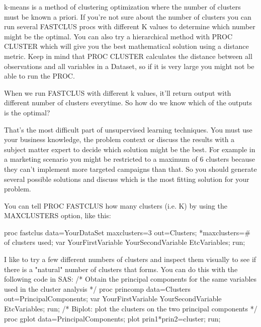 \documentclass[a4paper,12pt]{article}
\begin{document}
\newpage

k-means is a method of clustering optimization where the number of clusters must be known a priori. If you're not sure about the number of clusters you can run several FASTCLUS procs with different K values to determine which number might be the optimal. You can also try a hierarchical method with PROC CLUSTER which will give you the best mathematical solution using a distance metric. Keep in mind that PROC CLUSTER calculates the distance between all observations and all variables in a Dataset, so if it is very large you might not be able to run the PROC. 

When we run FASTCLUS with different k values, it'll return output with different number of clusters everytime. So how do we know which of the outputs is the optimal?

That's the most difficult part of unsupervised learning techniques. You must use your business knowledge, the 
problem context or discuss the results with a subject matter expert to decide which solution might be the best. 
For example in a marketing scenario you might be restricted to a maximum of 6 clusters because they can't implement 
more targeted campaigns than that. So you should generate several possible solutions and discuss which is the most 
fitting solution for your problem.

You can tell PROC FASTCLUS how many clusters (i.e. K) by using the MAXCLUSTERS option, like this:

proc fastclus data=YourDataSet maxclusters=3 out=Clusters; 
*maxclusters=# of clusters used;
     var YourFirstVariable YourSecondVariable EtcVariables;
run;

I like to try a few different numbers of clusters and inspect them visually to see if there is a "natural" number of clusters that forms. You can do this with the following code in SAS:
/* Obtain the principal components for the same variables used in the cluster analysis */
proc princomp data=Clusters out=PrincipalComponents;
     var YourFirstVariable YourSecondVariable EtcVariables;
run;
/* Biplot: plot the clusters on the two principal components */
proc gplot data=PrincipalComponents;
     plot prin1*prin2=cluster;
run;
\end{document}
